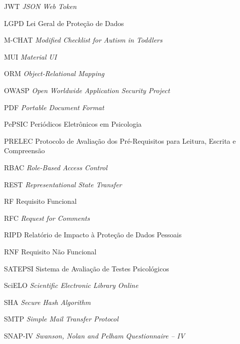 \begin{siglas}
  \item[JWT] \textit{JSON Web Token}

  \item[LGPD] Lei Geral de Proteção de Dados

  \item[M-CHAT] \textit{Modified Checklist for Autism in Toddlers}

  \item[MUI] \textit{Material UI}

  \item[ORM] \textit{Object-Relational Mapping}

  \item[OWASP] \textit{Open Worldwide Application Security Project}

  \item[PDF] \textit{Portable Document Format}

  \item[PePSIC] Periódicos Eletrônicos em Psicologia

  \item[PRELEC] Protocolo de Avaliação dos Pré-Requisitos para Leitura, Escrita e Compreensão

  \item[RBAC] \textit{Role-Based Access Control}

  \item[REST] \textit{Representational State Transfer}

  \item[RF] Requisito Funcional

  \item[RFC] \textit{Request for Comments}

  \item[RIPD] Relatório de Impacto à Proteção de Dados Pessoais

  \item[RNF] Requisito Não Funcional

  \item[SATEPSI] Sistema de Avaliação de Testes Psicológicos

  \item[SciELO] \textit{Scientific Electronic Library Online}

  \item[SHA] \textit{Secure Hash Algorithm}

  \item[SMTP] \textit{Simple Mail Transfer Protocol}

  \item[SNAP-IV] \textit{Swanson, Nolan and Pelham Questionnaire -- IV}


\end{siglas}
